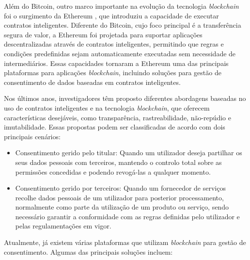 Além do Bitcoin, outro marco importante na evolução da tecnologia \textit{blockchain} foi o surgimento da Ethereum \citep{buterin2014next}, que introduziu a capacidade de executar contratos inteligentes. Diferente do Bitcoin, cujo foco principal é a transferência segura de valor, a Ethereum foi projetada para suportar aplicações descentralizadas através de contratos inteligentes, permitindo que regras e condições predefinidas sejam automaticamente executadas sem necessidade de intermediários. Essas capacidades tornaram a Ethereum uma das principais plataformas para aplicações \textit{blockchain}, incluindo soluções para gestão de consentimento de dados baseadas em contratos inteligentes.

Nos últimos anos, investigadores têm proposto diferentes abordagens baseadas no uso de contratos inteligentes e na tecnologia \textit{blockchain}, que oferecem características desejáveis, como transparência, rastreabilidade, não-repúdio e imutabilidade. Essas propostas podem ser classificadas de acordo com dois principais cenários:

\begin{itemize}
    \item Consentimento gerido pelo titular: Quando um utilizador deseja partilhar os seus dados pessoais com terceiros, mantendo o controlo total sobre as permissões concedidas e podendo revogá-las a qualquer momento.
    \item Consentimento gerido por terceiros: Quando um fornecedor de serviços recolhe dados pessoais de um utilizador para posterior processamento, normalmente como parte da utilização de um produto ou serviço, sendo necessário garantir a conformidade com as regras definidas pelo utilizador e pelas regulamentações em vigor.
\end{itemize}

Atualmente, já existem várias plataformas que utilizam \textit{blockchain} para gestão de consentimento. 
Algumas das principais soluções incluem:

